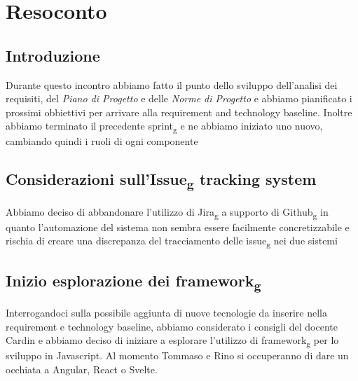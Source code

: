 \section{Resoconto}
\subsection{Introduzione}
Durante questo incontro abbiamo fatto il punto dello sviluppo dell'analisi dei requisiti, del \textit{Piano di Progetto} e delle \textit{Norme di Progetto} e abbiamo pianificato i prossimi obbiettivi per arrivare alla requirement and technology baseline. Inoltre abbiamo terminato il precedente sprint\textsubscript{g} e ne abbiamo iniziato uno nuovo, cambiando quindi i ruoli di ogni componente

\subsection{Considerazioni sull'Issue\textsubscript{g} tracking system}
Abbiamo deciso di abbandonare l'utilizzo di Jira\textsubscript{g} a supporto di Github\textsubscript{g} in quanto l'automazione del sistema non sembra essere facilmente concretizzabile e rischia di creare una discrepanza del tracciamento delle issue\textsubscript{g} nei due sistemi

\subsection{Inizio esplorazione dei framework\textsubscript{g}}
Interrogandoci sulla possibile aggiunta di nuove tecnologie da inserire nella requirement e technology baseline, abbiamo considerato i consigli del docente Cardin e abbiamo deciso di iniziare a esplorare l'utilizzo di framework\textsubscript{g} per lo sviluppo in Javascript. Al momento Tommaso e Rino si occuperanno di dare un occhiata a Angular, React o Svelte.


